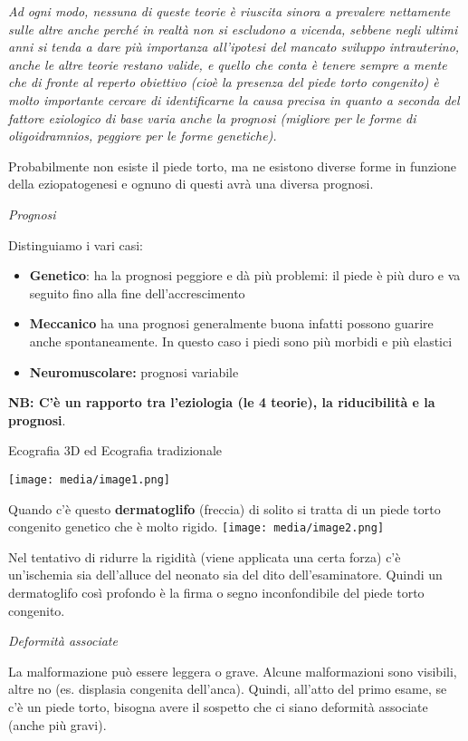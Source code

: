 \documentclass[]{article}
\begin{document}
\emph{Ad ogni modo, nessuna di queste teorie è riuscita sinora a
prevalere nettamente sulle altre anche perché in realtà \emph{non si
escludono a vicenda}, sebbene negli ultimi anni si tenda a dare più
importanza all'ipotesi del mancato sviluppo intrauterino, anche le altre
teorie restano valide, e quello che conta è tenere sempre a mente che di
fronte al reperto obiettivo (cioè la presenza del piede torto congenito)
è molto importante cercare di identificarne la causa precisa in quanto a
seconda del fattore eziologico di base \emph{varia anche la prognosi}
(migliore per le forme di oligoidramnios, peggiore per le forme
genetiche).}

Probabilmente non esiste il piede torto, ma ne esistono diverse forme in
funzione della eziopatogenesi e ognuno di questi avrà una diversa
prognosi.

\emph{Prognosi}

Distinguiamo i vari casi:

\begin{itemize}
\item
  \textbf{Genetico}: ha la prognosi peggiore e dà più problemi: il piede
  è più duro e va seguito fino alla fine dell'accrescimento
\item
  \textbf{Meccanico} ha una prognosi generalmente buona infatti possono
  guarire anche spontaneamente. In questo caso i piedi sono più morbidi
  e più elastici
\item
  \textbf{Neuromuscolare:} prognosi variabile
\end{itemize}

\textbf{NB: C'è un rapporto tra l'eziologia (le 4 teorie), la
riducibilità e la prognosi}.

Ecografia 3D ed Ecografia tradizionale

\texttt{[image: media/image1.png]}

Quando c'è questo \textbf{dermatoglifo} (freccia) di solito si tratta di
un piede torto congenito genetico che è molto rigido.
\texttt{[image: media/image2.png]}

Nel tentativo di ridurre la rigidità (viene applicata una certa forza)
c'è un'ischemia sia dell'alluce del neonato sia del dito
dell'esaminatore. Quindi un dermatoglifo così profondo è la firma o
segno inconfondibile del piede torto congenito.

\emph{Deformità associate}

La malformazione può essere leggera o grave. Alcune malformazioni sono
visibili, altre no (es. displasia congenita dell'anca). Quindi, all'atto
del primo esame, se c'è un piede torto, bisogna avere il sospetto che ci
siano deformità associate (anche più gravi).
\end{document}
